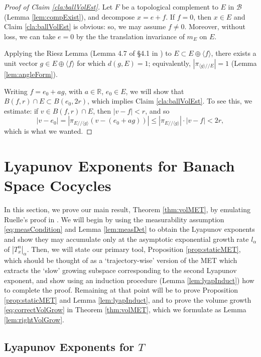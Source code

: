\documentclass[11pt]{amsart}
\theoremstyle{theorem}
\theoremstyle{definition}
\numberwithin{equation}{section}
\newcommand{\R}{\mathbb{R}}
\renewcommand{\a}{\alpha}
\newcommand{\Bc}{\mathcal{B}}
\newcommand{\ds}{/ \! /}
\begin{document}
\begin{proof}[Proof of Claim \ref{cla:ballVolEst}]
Let $F$ be a topological complement to $E$ in $\Bc$ (Lemma \ref{lem:compExist}), and decompose $x = e + f$. If $f = 0$, then $x \in E$ and Claim \ref{cla:ballVolEst} is obvious: so, we may assume $f \neq 0$. Moreover, without loss, we can take $e = 0$ by the the translation invariance of $m_E$ on $E$.

Applying the Riesz Lemma (Lemma 4.7 of \S 4.1 in \cite{S}) to $E \subset E \oplus \langle f \rangle$, there exists a unit vector $g \in E \oplus \langle f \rangle$ for which $d(g, E) = 1$; equivalently, $|\pi_{\langle g \rangle \ds E}| = 1$ (Lemma \ref{lem:angleForm}).

Writing $f = e_0 + a g$, with $a \in \R$, $e_0 \in E$, we will show that $B(f, r) \cap E \subset B(e_0, 2 r)$, which implies Claim \ref{cla:ballVolEst}. To see this, we estimate: if $v \in B( f, r) \cap E$, then $|v - f| < r$, and so
\[
|v - e_0| = |\pi_{E \ds \langle g \rangle} (v - (e_0 + a g))| \leq |\pi_{E \ds \langle g \rangle}| \cdot  |v - f| < 2 r,
\]
which is what we wanted.
\end{proof}


\section{Lyapunov Exponents for Banach Space Cocycles}

In this section, we prove our main result, Theorem \ref{thm:volMET}, by emulating Ruelle's proof in \cite{R1,R2}. We will begin by using the measurability assumption \eqref{eq:measCondition} and Lemma \ref{lem:measDet} to obtain the Lyapunov exponents and show they may accumulate only at the asymptotic exponential growth rate $l_{\a}$ of $|T^n_x|_{\a}$. Then, we will state our primary tool, Proposition \ref{prop:staticMET}, which should be thought of as a `trajectory-wise' version of the MET which extracts the `slow' growing subspace corresponding to the second Lyapunov exponent, and show using an induction procedure (Lemma \ref{lem:lyapInduct}) how to complete the proof. Remaining at that point will be to prove Proposition \ref{prop:staticMET} and Lemma \ref{lem:lyapInduct}, and to prove the volume growth \eqref{eq:correctVolGrow} in Theorem \ref{thm:volMET}, which we formulate as Lemma \ref{lem:rightVolGrow}.


\subsection{Lyapunov Exponents for $T$}
\end{document}
